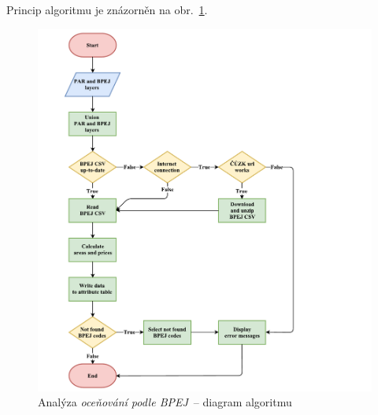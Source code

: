 Princip algoritmu je znázorněn na obr.~\ref{fig:diagram_bpej}.

	\begin{figure}[H]
		\includegraphics[width=1.2\textwidth]{./pictures/bpej.pdf}
		\caption[Analýza \textit{oceňování podle BPEJ}~– diagram algoritmu]{Analýza \textit{oceňování podle BPEJ}~– diagram algoritmu}
		\label{fig:diagram_bpej}
 	\end{figure}
